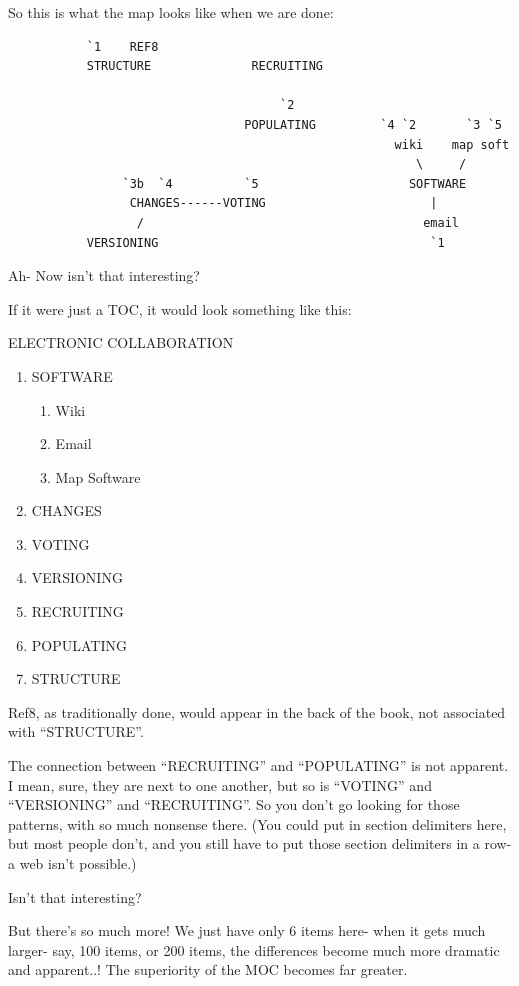 \documentclass[oneside]{book}
\begin{document}
So this is what the map looks like when we are done:

\begin{verbatim}
           `1    REF8
           STRUCTURE              RECRUITING

                                      `2
                                 POPULATING         `4 `2       `3 `5
                                                      wiki    map soft
                                                         \     /
                `3b  `4          `5                     SOFTWARE
                 CHANGES------VOTING                       |
                  /                                       email
           VERSIONING                                      `1
\end{verbatim}


Ah- Now isn't that interesting?

If it were just a TOC, it would look something like this:

ELECTRONIC COLLABORATION
\begin{enumerate}
\item   SOFTWARE
   \begin{enumerate}
   \item Wiki
   \item Email
   \item Map Software
   \end{enumerate}
\item  CHANGES
\item VOTING
\item  VERSIONING
\item  RECRUITING
\item  POPULATING
\item STRUCTURE
\end{enumerate}

Ref8, as traditionally done, would appear in the back of the book, not
associated with ``STRUCTURE''.

The connection between ``RECRUITING'' and ``POPULATING'' is not
apparent. I mean, sure, they are next to one another, but so is
``VOTING'' and ``VERSIONING'' and ``RECRUITING''. So you don't go looking
for those patterns, with so much nonsense there.  (You could put in
section delimiters here, but most people don't, and you still have
to put those section delimiters in a row- a web isn't possible.)

Isn't that interesting?

But there's so much more! We just have only 6 items here- when it gets
much larger- say, 100 items, or 200 items, the differences become much
more dramatic and apparent..! The superiority of the MOC becomes far
greater.
\end{document}
